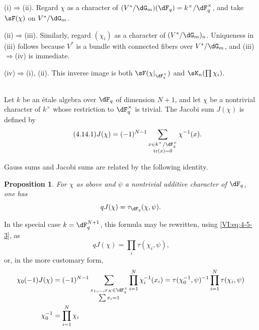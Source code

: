 \documentclass[12pt,oneside,english]{smfbook}
\DeclareMathOperator{\tr}{tr}
\newcounter{char}
\newtheorem{proposition_}[subsection]{Proposition}
\begin{document}
(i)$\Rightarrow$(ii). Regard $\chi$ as a character of $(V^\ast/\dG_m)(\dF_q)=k^\times/\dF_q^\times$, and take $\sF(\chi)$ on $V^\ast/\dG_m$.

(ii)$\Rightarrow$(iii). Similarly, regard $(\chi_i)$ as a character of $(V^\ast/\dG_m)_n$. Uniqueness in (iii) follows because $V^\ast$ is a bundle with connected fibers over $V^\ast/\dG_m$, and (iii)$\Rightarrow$(iv) is immediate.

(iv)$\Rightarrow$(i), (ii). This inverse image is both $\sF(\chi|_{\dF_q^\times})$ and $\sK_n(\prod\chi_i)$.

\subsection{}\label{VI:4-14}

Let $k$ be an étale algebra over $\dF_q$ of dimension $N+1$, and let $\chi$ be a nontrivial character of $k^\times$ whose restriction to $\dF_q^\times$ is trivial. The Jacobi sum $J(\chi)$ is defined by
\begin{equation*}\tag{4.14.1}\label{VI:eq:4-14-1}
  J(\chi) = (-1)^{N-1} \sum_{\substack{x\in k^\times/\dF_q^\times \\ \tr(x)=0}} \chi^{-1}(x) \text{.}
\end{equation*}

Gauss sums and Jacobi sums are related by the following identity.

\begin{proposition_}\label{VI:4-15}
For $\chi$ as above and $\psi$ a nontrivial additive character of $\dF_q$, one has
\[
  q J(\chi) = \tau_{\dF_q}(\chi,\psi) \text{.}
\]
\end{proposition_}

In the special case $k=\dF_q^{N+1}$, this formula may be rewritten, using \eqref{VI:eq:4-5-3}, as
\begin{equation*}\tag{4.15.1}\label{VI:eq:4-15-1}
  q J(\chi) = \prod_i \tau(\chi_i,\psi) \text{,}
\end{equation*}
or, in the more customary form,
\begin{align*}
  \chi_0(-1) J(\chi) &= (-1)^{N-1} \sum_{\substack{x_1,\dots,x_N\in \dF_q^\times \\ \sum x_i = 1}} \prod_{i=1}^N \chi_i^{-1}(x_i) = \tau(\chi_0^{-1},\psi)^{-1} \prod_{i=1}^N \tau(\chi_i,\psi) \\
  \chi_0^{-1} &= \prod_{i=1}^N \chi_i
\end{align*}
\end{document}
